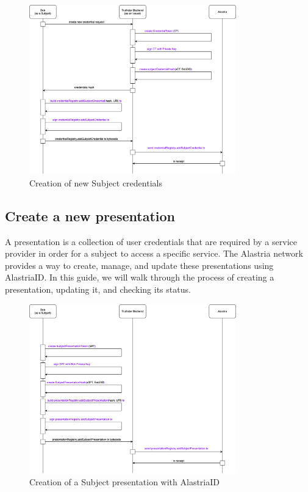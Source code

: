 \documentclass[target=mst,aauheader=]{thud}
\begin{document}
\begin{figure}
    \centering
    \includegraphics[width=0.8\textwidth]{images/createSubjectCredentials.png}
    \caption{Creation of new Subject credentials}
    \label{fig:createSubjectCredentials}
\end{figure}

\subsection{Create a new presentation}

A presentation is a collection of user credentials that are required by a service provider in order for a subject to access a specific service. The Alastria network provides a way to create, manage, and update these presentations using AlastriaID. In this guide, we will walk through the process of creating a presentation, updating it, and checking its status.

\begin{figure}
    \centering
    \includegraphics[width=0.8\textwidth]{images/createSubjectPresentation.png}
    \caption{Creation of a Subject presentation with AlastriaID}
    \label{fig:createSubjectPresentation}
\end{figure}
\end{document}
